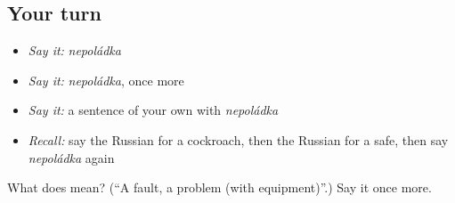 \subsection*{Your turn}
\begin{itemize}
\raggedright
  \item \emph{Say it:} \emph{nepoládka}
  \item \emph{Say it:} \emph{nepoládka}, once more
  \item \emph{Say it:} a sentence of your own with \emph{nepoládka}
  \item \emph{Recall:} say the Russian for a cockroach, then the Russian for a safe, then say \emph{nepoládka} again
\end{itemize}

\begin{tcolorbox}[breakable,colback=teal!4,colframe=teal!35!black,title={Before you move on}]
What does  mean? (\textquotedblleft{}A fault, a problem (with equipment)\textquotedblright{}.) Say it once more.
\end{tcolorbox}
